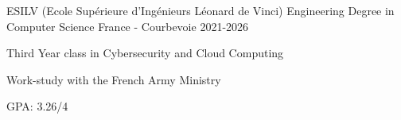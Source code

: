 

\begin{cventries}

	\edentry
	{ESILV (Ecole Supérieure d'Ingénieurs Léonard de Vinci)} %
	{Engineering Degree in Computer Science} %
	{France - Courbevoie} %
    {2021-2026}
	{
		\begin{cvitems} %
			\item {Third Year class in Cybersecurity and Cloud Computing}
			\item { Work-study with the French Army Ministry}
		\end{cvitems}
	}
	{GPA: 3.26/4}

\end{cventries}
